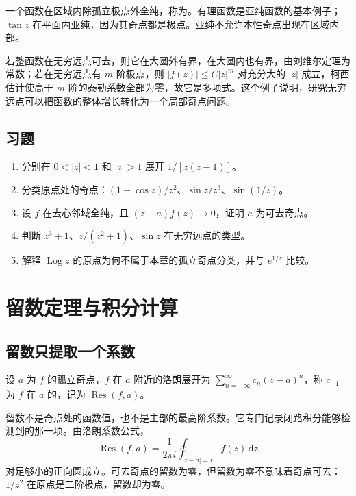\documentclass[UTF8,12pt,a4paper,fontset=fandol]{ctexbook}
\begin{document}
一个函数在区域内除孤立极点外全纯，称为。有理函数是亚纯函数的基本例子；$\tan z$ 在平面内亚纯，因为其奇点都是极点。亚纯不允许本性奇点出现在区域内部。

若整函数在无穷远点可去，则它在大圆外有界，在大圆内也有界，由刘维尔定理为常数；若在无穷远点有 $m$ 阶极点，则 $|f(z)|\le C|z|^m$ 对充分大的 $|z|$ 成立，柯西估计使高于 $m$ 阶的泰勒系数全部为零，故它是多项式。这个例子说明，研究无穷远点可以把函数的整体增长转化为一个局部奇点问题。

\section{习题}
\label{sec:cv-laurent-ex}
\begin{enumerate}
 \item 分别在 $0<|z|<1$ 和 $|z|>1$ 展开 $1/[z(z-1)]$。
 \item 分类原点处的奇点：$(1-\cos z)/z^2$、$\sin z/z^3$、$\sin(1/z)$。
 \item 设 $f$ 在去心邻域全纯，且 $(z-a)f(z)\to0$，证明 $a$ 为可去奇点。
 \item 判断 $z^3+1$、$z/(z^2+1)$、$\sin z$ 在无穷远点的类型。
 \item 解释 $\operatorname{Log}z$ 的原点为何不属于本章的孤立奇点分类，并与 $e^{1/z}$ 比较。
\end{enumerate}

\chapter{留数定理与积分计算}
\label{chap:cv-residue}

\section{留数只提取一个系数}

\begin{definition}[留数]
设 $a$ 为 $f$ 的孤立奇点，$f$ 在 $a$ 附近的洛朗展开为 $\sum_{n=-\infty}^\infty c_n(z-a)^n$，称 $c_{-1}$ 为 $f$ 在 $a$ 的，记为 $\operatorname{Res}(f,a)$。
\end{definition}

留数不是奇点处的函数值，也不是主部的最高阶系数。它专门记录闭路积分能够检测到的那一项。由洛朗系数公式，
\[
 \operatorname{Res}(f,a)=\frac1{2\pi i}\oint_{|z-a|=r}f(z)\,\mathrm dz
\]
对足够小的正向圆成立。可去奇点的留数为零，但留数为零不意味着奇点可去：$1/z^2$ 在原点是二阶极点，留数却为零。
\end{document}
